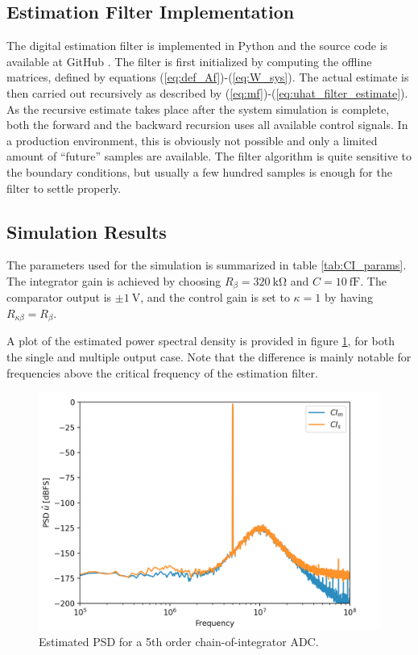 \subsection{Estimation Filter Implementation}
The digital estimation filter is implemented in Python and the source code is available at GitHub \cite{cbadcsim2}. The filter is first initialized by computing the offline matrices, defined by equations (\ref{eq:def_Af})-(\ref{eq:W_sys}). The actual estimate is then carried out recursively as described by (\ref{eq:mf})-(\ref{eq:uhat_filter_estimate}). As the recursive estimate takes place after the system simulation is complete, both the forward and the backward recursion uses all available control signals. In a production environment, this is obviously not possible and only a limited amount of \enquote{future} samples are available. The filter algorithm is quite sensitive to the boundary conditions, but usually a few hundred samples is enough for the filter to settle properly.

\subsection{Simulation Results}
The parameters used for the simulation is summarized in table \ref{tab:CI_params}. The integrator gain is achieved by choosing $R_{\beta} = \SI{320}{\kilo\ohm}$ and $C = \SI{10}{\femto\farad}$. The comparator output is $\pm \SI{1}{\volt}$, and the control gain is set to $\kappa=1$ by having $R_{\kappa\beta} = R_\beta$.


A plot of the estimated power spectral density is provided in figure \ref{fig:CI_sim_N5}, for both the single and multiple output case. Note that the difference is mainly notable for frequencies above the critical frequency of the estimation filter.
\begin{figure}
    \centering
    \includegraphics[width=\linewidth]{figures/051chain/CI_SIM_N5.png}
    \caption{Estimated PSD for a 5th order chain-of-integrator ADC.}
    \label{fig:CI_sim_N5}
\end{figure}

